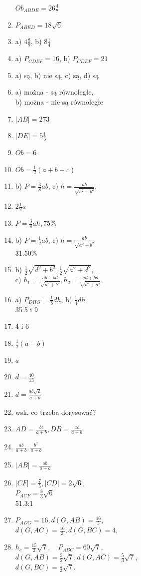 \documentclass[10pt]{article}
\begin{document}
\begin{enumerate}
\(O b_{A B D E}=26 \frac{4}{7}\)
  \item \(P_{A B E D}=18 \sqrt{6}\)
  \item a) \(4 \frac{8}{9}\), b) \(8 \frac{1}{4}\)
  \item a) \(P_{C D E F}=16\), b) \(P_{C D E F}=21\)
  \item a) są, b) nie są, c) są, d) są
  \item a) można - są równoległe,\\
b) można - nie są równoległe
  \item \(|A B|=273\)
  \item \(|D E|=5 \frac{1}{3}\)
  \item \(O b=6\)
  \item \(O b=\frac{1}{2}(a+b+c)\)
  \item b) \(P=\frac{3}{8} a b\), c) \(h=\frac{a b}{\sqrt{a^{2}+b^{2}}}\),
  \item \(2 \frac{1}{2} a\)
  \item \(P=\frac{3}{8} a h, 75 \%\)
  \item b) \(P=\frac{1}{2} a b\), c) \(h=\frac{a b}{\sqrt{a^{2}+b^{2}}}\)\\
31.50\%
  \item b) \(\frac{1}{2} \sqrt{d^{2}+b^{2}}, \frac{1}{2} \sqrt{a^{2}+d^{2}}\),\\
c) \(h_{1}=\frac{a b+b d}{\sqrt{d^{2}+b^{2}}}, h_{2}=\frac{a d+b d}{\sqrt{d^{2}+a^{2}}}\)
  \item a) \(P_{D H G}=\frac{1}{8} d h\), b) \(\frac{1}{4} d h\)\\
35.5 i 9
  \item 4 i 6
  \item \(\frac{1}{2}(a-b)\)
  \item \(a\)
  \item \(d=\frac{40}{13}\)
  \item \(d=\frac{a b \sqrt{2}}{a+b}\)
  \item wsk. co trzeba dorysować?
  \item \(A D=\frac{b c}{a+b}, D B=\frac{a c}{a+b}\)
  \item \(\frac{a b}{a+b}, \frac{b^{2}}{a+b}\)
  \item \(|A B|=\frac{a b}{a+b}\)
  \item \(|C F|=\frac{7}{5},|C D|=2 \sqrt{6}\),\\
\(P_{A C F}=\frac{8}{5} \sqrt{6}\)\\
51.3:1
  \item \(P_{A D G}=16, d(G, A B)=\frac{16}{5}\),\\
\(d(G, A C)=\frac{16}{3}, d(G, B C)=4\),
  \item \(h_{c}=\frac{15}{2} \sqrt{7}, \quad P_{A B C}=60 \sqrt{7}\),\\
\(d(G, A B)=\frac{5}{2} \sqrt{7}, d(G, A C)=\frac{5}{3} \sqrt{7}\),\\
\(d(G, B C)=\frac{1}{2} \sqrt{7}\).
\end{enumerate}
\end{document}
